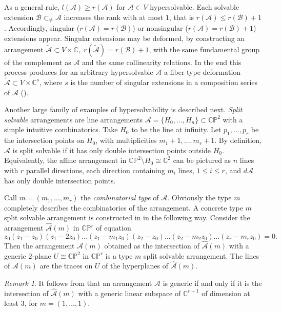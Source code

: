 \documentclass[psamsfonts]{conm-p-l}
\theoremstyle{definition}
\theoremstyle{remark}
\newtheorem{remark}[theorem]{Remark}
\numberwithin{equation}{section}
\newcommand{\A}{{\mathcal A}}
\newcommand{\B}{{\mathcal B}}
\newcommand{\C}{\mathbb{C}}
\newcommand{\p}{\mathbb{P}}
\begin{document}
 As a general rule, $l(\A) \geq r(\A)$ for $\A \subset V$ hypersolvable. Each solvable extension 
 $\B \subset_{\neq} \A$ increases the rank with at most $1$, that is $r(\A) \leq r(\B)+1$. 
 Accordingly, singular ($r(\A) = r(\B)$) or nonsingular
 ($r(\A) =r(\B)+1$) extensions appear. Singular extensions may be deformed, by 
 constructing an arrangement $\tilde{\A} \subset V \times \C,\; r(\tilde{\A})= r(\B)+1$, with 
 the same fundamental group of the complement as $\A$ and the same 
 collinearity relations.
 In the end this process produces for an arbitrary hypersolvable $\A$ a fiber-type 
 deformation $\tilde{\A} \subset V \times \C^s$, where $s$ is the number
 of singular extensions in a composition series of $\A$ (\cite{JP2}).
 
Another large family of examples of hypersolvability is described next.
 {\it Split solvable} arrangements are line arrangements $\A=\{H_0, \dots,H_n\} \subset \C\p^2$ 
 with a simple intuitive combinatorics. Take
 $H_0$ to be the line at infinity.  Let $p_1, \dots, p_r$ be the intersection points on $H_0$,
 with multiplicities $m_1+1, \dots, m_r+1$. By definition, $\A$ is split solvable if
 it has only double intersection points outside $H_0$.
  Equivalently, the affine arrangement in $\C\p^2\setminus H_0 \cong \C^2$ can be pictured 
  as $n$ lines with $r$ parallel directions, each direction containing $m_i$ lines, 
  $1 \leq i \leq r$, and $d\A$ has only double intersection points.
  
Call $m=(m_1, \dots, m_r)$ the {\it combinatorial type} of $\A$. Obviously the type $m$ 
completely describes the combinatorics of the arrangement.
A concrete type $m$ split solvable arrangement is constructed in \cite{CDP} in the following way.
Consider the arrangement $\hat{\A}(m)$ in $\C\p^r$ of equation
%
\begin{equation}
\label{longeq}
 z_0(z_1-z_0)(z_1-2z_0) \dots (z_1-m_1z_0)(z_2-z_0)\dots (z_2-m_2z_0) \dots (z_r-m_rz_0)=0.
\end{equation}
%
 Then the arrangement $\A(m)$ obtained as the intersection of $\hat{\A}(m)$ with 
 a generic $2$-plane $U \cong \C\p^2$ in $\C\p^r$ is a type $m$ split solvable arrangement. 
 The lines of $\A(m)$ are the traces on $U$ of the hyperplanes of $\hat{\A}(m)$. 
 
 \begin{remark}
 \label{rem:hat}
 It follows from \cite{Ha} that an arrangement $\A$ is generic if and only if
 it is the intersection of $\hat{\A}(m)$ with a generic linear subspace of $\C^{r+1}$
 of dimension at least $3$, for $m=(1,\dots, 1)$.
 \end{remark}
 
\end{document}
